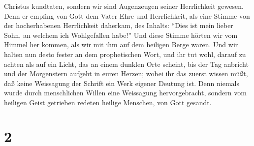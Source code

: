 Christus kundtaten, sondern wir sind Augenzeugen seiner Herrlichkeit
gewesen.  Denn er empfing von Gott dem Vater Ehre und
Herrlichkeit, als eine Stimme von der hocherhabenen Herrlichkeit
daherkam, des Inhalts: ``Dies ist mein lieber Sohn, an welchem ich
Wohlgefallen habe!''  Und diese Stimme hörten wir vom
Himmel her kommen, als wir mit ihm auf dem heiligen Berge waren.
 Und wir halten nun desto fester an dem prophetischen
Wort, und ihr tut wohl, darauf zu achten als auf ein Licht, das an einem
dunklen Orte scheint, bis der Tag anbricht und der Morgenstern aufgeht
in euren Herzen;  wobei ihr das zuerst wissen müßt, daß
keine Weissagung der Schrift ein Werk eigener Deutung ist.
 Denn niemals wurde durch menschlichen Willen eine
Weissagung hervorgebracht, sondern vom heiligen Geist getrieben redeten
heilige Menschen, von Gott gesandt.

\hypertarget{section-1}{%
\section{2}\label{section-1}}

